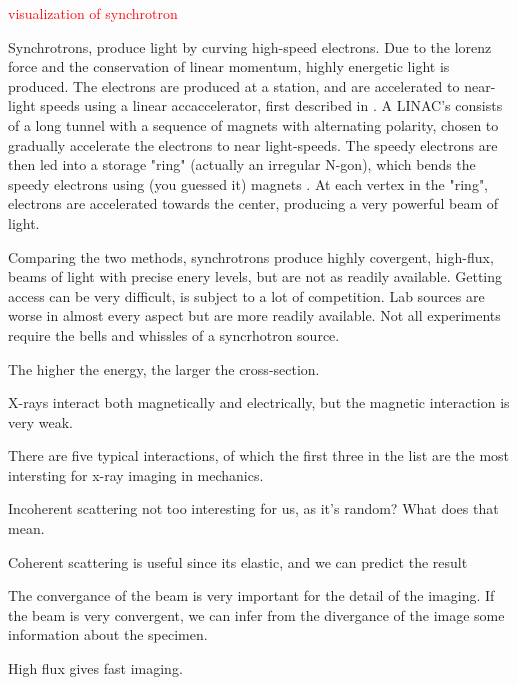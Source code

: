 \textcolor{red}{visualization of synchrotron}

Synchrotrons, produce light by curving high-speed electrons. Due to the lorenz force and the conservation of linear momentum, highly energetic light is produced. The electrons are produced at a station, and are accelerated to near-light speeds using a linear accaccelerator, first described in \cite{ising1924prinzip}. A LINAC's consists of a long tunnel with a sequence of magnets with alternating polarity, chosen to gradually accelerate the electrons to near light-speeds. The speedy electrons are then led into a storage "ring" (actually an irregular N-gon), which bends the speedy electrons using (you guessed it) magnets \cite{shin2021new}. At each vertex in the "ring", electrons are accelerated towards the center, producing a very powerful beam of light.

Comparing the two methods, synchrotrons produce highly covergent, high-flux, beams of light with precise enery levels, but are not as readily available. Getting access can be very difficult, is subject to a lot of competition. Lab sources are worse in almost every aspect but are more readily available. Not all experiments require the bells and whissles of a syncrhotron source.


The higher the energy, the larger the cross-section.

X-rays interact both magnetically and electrically, but the magnetic interaction is very weak.

There are five typical interactions, of which the first three in the list are the most intersting for x-ray imaging in mechanics.

Incoherent scattering not too interesting for us, as it's random? What does that mean.

Coherent scattering is useful since its elastic, and we can predict the result

The convergance of the beam is very important for the detail of the imaging. If the beam is very convergent, we can infer from the divergance of the image some information about the specimen.

High flux gives fast imaging.



